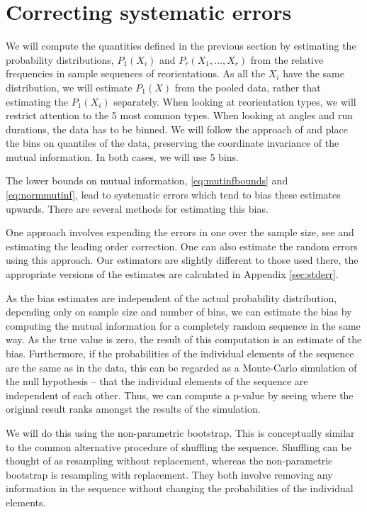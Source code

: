 \documentclass[12pt]{article}
\begin{document}
\section{Correcting systematic errors}\label{sec:syscorr}

We will compute the quantities defined in the previous section by estimating the probability distributions, $P_1(X_i)$ and $P_r(X_1,\ldots,X_r)$ from the relative frequencies in sample sequences of reorientations. As all the $X_i$ have the same distribution, we will estimate $P_1(X)$ from the pooled data, rather that estimating the $P_1(X_i)$ separately. When looking at reorientation types, we will restrict attention to the 5 most common types. When looking at angles and run durations, the data has to be binned. We will follow the approach of \cite{2005cs........2017S} and place the bins on quantiles of the data, preserving the coordinate invariance of the mutual information. In both cases, we will use 5 bins.


The lower bounds on mutual information, \eqref{eq:mutinfbounds} and \eqref{eq:normmutinf}, lead to systematic errors which tend to bias these estimates upwards. There are several methods for estimating this bias.

One approach involves expending the errors in one over the sample size, see \cite{1999PhyD..125..285R} and estimating the leading order correction. One can also estimate the random errors using this approach. Our estimators are slightly different to those used there, the appropriate versions of the estimates are calculated in Appendix \ref{sec:stderr}.

As the bias estimates are independent of the actual probability distribution, depending only on sample size and number of bins, we can estimate the bias by computing the mutual information for a completely random sequence in the same way. As the true value is zero, the result of this computation is an estimate of the bias. Furthermore, if the probabilities of the individual elements of the sequence are the same as in the data, this can be regarded as a Monte-Carlo simulation of the null hypothesis -- that the individual elements of the sequence are independent of each other. Thus, we can compute a p-value by seeing where the original result ranks amongst the results of the simulation.

We will do this using the non-parametric bootstrap. This is conceptually similar to the common alternative procedure of shuffling the sequence. Shuffling can be thought of as resampling without replacement, whereas the non-parametric bootstrap is resampling with replacement. They both involve removing any information in the sequence without changing the probabilities of the individual elements.
\end{document}
